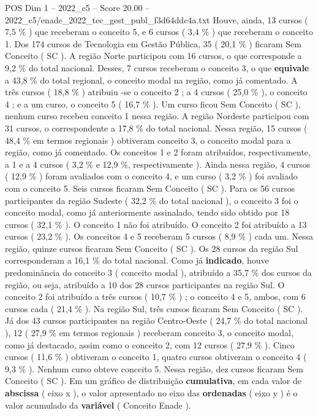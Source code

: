 \begin{textsample}{POS Dim 1 – 2022\_c5 – Score 20.00 – 2022\_c5/enade\_2022\_tec\_gest\_publ\_f3d64ddc4a.txt}
Houve, ainda, 13 cursos ( 7,5 \% ) que receberam o conceito 5, e 6 cursos ( 3,4 \% ) que receberam o conceito 1.
Dos 174 cursos de Tecnologia em Gestão Pública, 35 ( 20,1 \% ) ficaram Sem Conceito ( SC ).
A região Norte participou com 16 cursos, o que corresponde a 9,2 \% do total nacional.
Desses, 7 cursos receberam o conceito 3, o que \textbf{equivale} a 43,8 \% do total regional, o conceito modal na região, como já comentado.
A três cursos ( 18,8 \% ) atribuiu -se o conceito 2 ; a 4 cursos ( 25,0 \% ), o conceito 4 ; e a um curso, o conceito 5 ( 16,7 \% ).
Um curso ficou Sem Conceito ( SC ), nenhum curso recebeu conceito 1 nessa região.
A região Nordeste participou com 31 cursos, o correspondente a 17,8 \% do total nacional.
Nessa região, 15 cursos ( 48,4 \% em termos regionais ) obtiveram conceito 3, o conceito modal para a região, como já comentado.
Os conceitos 1 e 2 foram atribuídos, respectivamente, a 1 e a 4 cursos ( 3,2 \% e 12,9 \%, respectivamente ).
Ainda nessa região, 4 cursos ( 12,9 \% ) foram avaliados com o conceito 4, e um curso ( 3,2 \% ) foi avaliado com o conceito 5.
Seis cursos ficaram Sem Conceito ( SC ).
Para os 56 cursos participantes da região Sudeste ( 32,2 \% do total nacional ), o conceito 3 foi o conceito modal, como já anteriormente assinalado, tendo sido obtido por 18 cursos ( 32,1 \% ).
O conceito 1 não foi atribuído.
O conceito 2 foi atribuído a 13 cursos ( 23,2 \% ).
Os conceitos 4 e 5 receberam 5 cursos ( 8,9 \% ) cada um.
Nessa região, quinze cursos ficaram Sem Conceito ( SC ).
Os 28 cursos da região Sul corresponderam a 16,1 \% do total nacional.
Como já \textbf{indicado}, houve predominância do conceito 3 ( conceito modal ), atribuído a 35,7 \% dos cursos da região, ou seja, atribuído a 10 dos 28 cursos participantes na região Sul.
O conceito 2 foi atribuído a três cursos ( 10,7 \% ) ; o conceito 4 e 5, ambos, com 6 cursos cada ( 21,4 \% ).
Na região Sul, três cursos ficaram Sem Conceito ( SC ).
Já dos 43 cursos participantes na região Centro-Oeste ( 24,7 \% do total nacional ), 12 ( 27,9 \% em termos regionais ) receberam conceito 3, o conceito modal, como já destacado, assim como o conceito 2, com 12 cursos ( 27,9 \% ).
Cinco cursos ( 11,6 \% ) obtiveram o conceito 1, quatro cursos obtiveram o conceito 4 ( 9,3 \% ).
Nenhum curso obteve conceito 5.
Nessa região, dez cursos ficaram Sem Conceito ( SC ).
Em um gráfico de distribuição \textbf{cumulativa}, em cada valor de \textbf{abscissa} ( eixo x ), o valor apresentado no eixo das \textbf{ordenadas} ( eixo y ) é o valor acumulado da \textbf{variável} ( Conceito Enade ).

\end{textsample}
